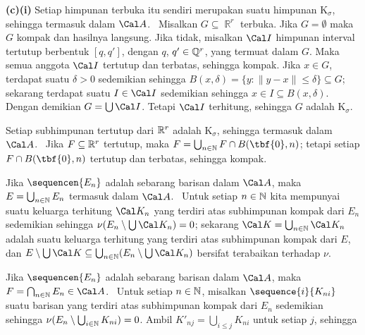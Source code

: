 {


\medskip

{\bf (c)(i)} Setiap himpunan terbuka itu sendiri merupakan suatu himpunan K$_{\sigma}$, sehingga termasuk dalam
$\Cal A$.
\Prf\ Misalkan $G\subseteq\BbbR^r$ terbuka.   Jika $G=\emptyset$ maka $G$
kompak dan hasilnya langsung.   Jika tidak, misalkan $\Cal I$ himpunan
interval tertutup berbentuk $[q,q']$, dengan $q$, $q'\in\Bbb Q^r$,
yang termuat dalam $G$.   Maka semua anggota $\Cal I$ tertutup
dan terbatas, sehingga kompak.   Jika $x\in G$, terdapat suatu $\delta>0$
sedemikian sehingga $B(x,\delta)=\{y:\|y-x\|\le\delta\}\subseteq G$;  sekarang terdapat
suatu $I\in\Cal I$ sedemikian sehingga $x\in I\subseteq B(x,\delta)$.   Dengan demikian
$G=\bigcup\Cal I$.   Tetapi $\Cal I$ terhitung, sehingga $G$ adalah K$_{\sigma}$.\
\Qed

\medskip

 Setiap subhimpunan tertutup dari $\Bbb R^r$ adalah K$_{\sigma}$, sehingga
termasuk dalam $\Cal A$.
\Prf\ Jika $F\subseteq\Bbb R^r$ tertutup, maka
$F=\bigcup_{n\in\Bbb N}F\cap B(\tbf{0},n)$;  tetapi setiap $F\cap
B(\tbf{0},n)$ tertutup dan terbatas, sehingga kompak.\ \Qed

\medskip

 Jika $\sequencen{E_n}$ adalah sebarang barisan dalam $\Cal A$, maka
$E=\bigcup_{n\in\Bbb N}E_n$ termasuk dalam
$\Cal A$.   \Prf\ Untuk setiap $n\in\Bbb N$ kita mempunyai suatu keluarga terhitung
$\Cal K_n$ yang terdiri atas subhimpunan kompak dari $E_n$ sedemikian sehingga $\nu(E_n\setminus\bigcup\Cal K_n)=0$;  sekarang
$\Cal K=\bigcup_{n\in\Bbb N}\Cal K_n$ adalah suatu keluarga terhitung
yang terdiri atas subhimpunan kompak dari $E$, dan
$E\setminus\bigcup\Cal K
\subseteq\bigcup_{n\in\Bbb N}(E_n\setminus\bigcup\Cal K_n)$ bersifat
terabaikan terhadap $\nu$.\ \Qed

\medskip

 Jika $\sequencen{E_n}$ adalah sebarang barisan dalam $\Cal A$, maka
$F=\bigcap_{n\in\Bbb N}E_n\in\Cal A$.   \Prf\ Untuk setiap $n\in\Bbb N$, misalkan
$\sequence{i}{K_{ni}}$ suatu barisan yang terdiri atas subhimpunan kompak dari $E_n$ sedemikian
sehingga $\nu(E_n\setminus\bigcup_{i\in\Bbb N}K_{ni})=0$.   Ambil
$K'_{nj}=\bigcup_{i\le j}K_{ni}$ untuk setiap $j$, sehingga

}
